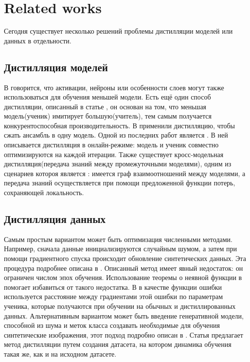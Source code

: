 \documentclass[12pt]{article}
\begin{document}
\section{Related works}

 Сегодня существует несколько решений проблемы дистилляции моделей или данных в отдельности. 

\subsection{Дистилляция моделей}
В \cite{romero2014fitnets} говорится, что активации, нейроны или особенности слоев могут также использоваться для обучения меньшей модели. Есть ещё один способ дистилляции, описанный в статье \cite{ba2014deep}, он основан на том, что меньшая модель(ученик) имитирует большую(учитель), тем самым получается конкурентоспособная производительность. В \cite{hinton2015distilling} применили дистилляцию, чтобы сжать ансамбль в одну модель. Одной из последних работ является \cite{chung2020feature}. В ней описывается дистилляция в онлайн-режиме: модель и ученик совместно оптимизируются на каждой итерации. Также существует кросс-модельная дистилляция(передача знаний между промежуточными моделями), одним из сценариев котороя является \cite{chen2021learning}: имеется граф взаимоотношений между моделями, а передача знаний осуществляется при помощи предложенной функции потерь, сохраняющей локальность.




\subsection{Дистилляция данных}
Самым простым вариантом может быть оптимизация численными методами. Например, сначала данные инициализируются случайным шумом, а затем при помощи градиентного спуска происходит обновление синтетических данных. Эта процедура подробнее описана в \cite{wang2018dataset}. Описанный метод имеет явный недостаток: он ограничен числом эпох обучения. Использование теоремы о неявной функции в \cite{lorraine2020optimizing} помогает избавиться от такого недостатка. В \cite{zhao2020dataset} в качестве функции ошибки используется расстояние между градиентами этой ошибки по параметрам ученика, которые получаются при обучении на обычных и дистиллированных данных. Альтернативным вариантом может быть введение генеративной модели, способной из шума и меток класса создавать необходимые для обучения синтетические изображения, этот подход подробно описан в \cite{such2020generative}.
Статья \cite{cazenavette2022dataset} предлагает метод дистилляции путем создания датасета, на котором динамика обучения такая же, как и на исходном датасете.
\end{document}
